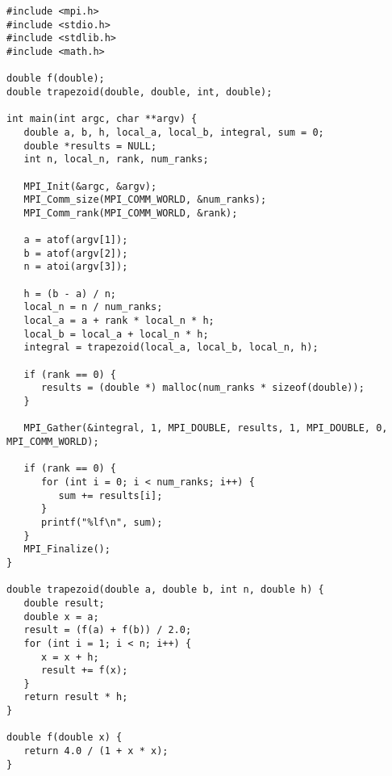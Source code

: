 \documentclass{tmr}
\begin{document}
\begin{Verbatim}
#include <mpi.h>
#include <stdio.h>
#include <stdlib.h>
#include <math.h>

double f(double);
double trapezoid(double, double, int, double);

int main(int argc, char **argv) {
   double a, b, h, local_a, local_b, integral, sum = 0;
   double *results = NULL;
   int n, local_n, rank, num_ranks;

   MPI_Init(&argc, &argv);
   MPI_Comm_size(MPI_COMM_WORLD, &num_ranks);
   MPI_Comm_rank(MPI_COMM_WORLD, &rank);

   a = atof(argv[1]);
   b = atof(argv[2]);
   n = atoi(argv[3]);

   h = (b - a) / n;
   local_n = n / num_ranks;
   local_a = a + rank * local_n * h;
   local_b = local_a + local_n * h;
   integral = trapezoid(local_a, local_b, local_n, h);

   if (rank == 0) {
      results = (double *) malloc(num_ranks * sizeof(double));
   }

   MPI_Gather(&integral, 1, MPI_DOUBLE, results, 1, MPI_DOUBLE, 0, MPI_COMM_WORLD);

   if (rank == 0) {
      for (int i = 0; i < num_ranks; i++) {
         sum += results[i];
      }
      printf("%lf\n", sum);
   }
   MPI_Finalize();
}

double trapezoid(double a, double b, int n, double h) {
   double result;
   double x = a;
   result = (f(a) + f(b)) / 2.0;
   for (int i = 1; i < n; i++) {
      x = x + h;
      result += f(x);
   }
   return result * h;
}

double f(double x) {
   return 4.0 / (1 + x * x);
}
\end{Verbatim}


\end{document}
